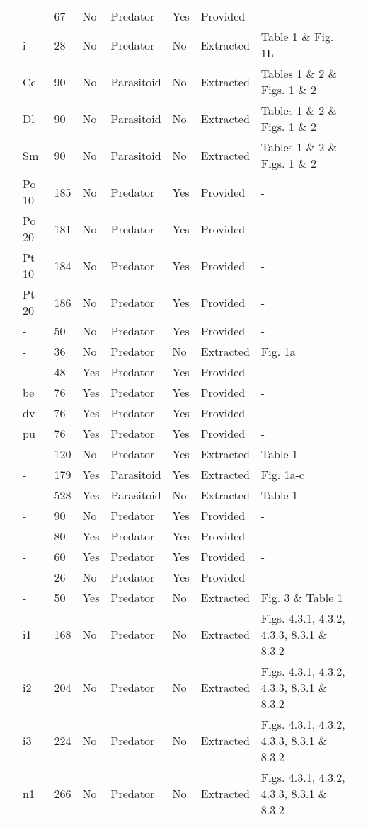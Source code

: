 \begin{longtable}{lllllllll}
\citet{Kratina:2009aa}&-&67&No&Predator&Yes&Provided&-&\citet{Kratina:2020aa}\tabularnewline
\citet{Krylov:1992aa}&i&28&No&Predator&No&Extracted&Table 1 \& Fig. 1L&\citet{Novak:2020aa}\tabularnewline
\citet{Kumar:1985aa}&Cc&90&No&Parasitoid&No&Extracted&Tables 1 \& 2 \& Figs. 1 \& 2&\citet{Novak:2020aa}\tabularnewline
\citet{Kumar:1985aa}&Dl&90&No&Parasitoid&No&Extracted&Tables 1 \& 2 \& Figs. 1 \& 2&\citet{Novak:2020aa}\tabularnewline
\citet{Kumar:1985aa}&Sm&90&No&Parasitoid&No&Extracted&Tables 1 \& 2 \& Figs. 1 \& 2&\citet{Novak:2020aa}\tabularnewline
\citet{Lang:2012aa}&Po 10&185&No&Predator&Yes&Provided&-&\citet{Lang:2020aa}\tabularnewline
\citet{Lang:2012aa}&Po 20&181&No&Predator&Yes&Provided&-&\citet{Lang:2020aa}\tabularnewline
\citet{Lang:2012aa}&Pt 10&184&No&Predator&Yes&Provided&-&\citet{Lang:2020aa}\tabularnewline
\citet{Lang:2012aa}&Pt 20&186&No&Predator&Yes&Provided&-&\citet{Lang:2020aa}\tabularnewline
\citet{Long:2012aa}&-&50&No&Predator&Yes&Provided&-&\citet{Long:2020aa}\tabularnewline
\citet{Mansour:1991aa}&-&36&No&Predator&No&Extracted&Fig. 1a&\citet{Novak:2020aa}\tabularnewline
\citet{Medoc:2013aa}&-&48&Yes&Predator&Yes&Provided&-&\tabularnewline
\citet{Medoc:2015aa}&be&76&Yes&Predator&Yes&Provided&-&\tabularnewline
\citet{Medoc:2015aa}&dv&76&Yes&Predator&Yes&Provided&-&\tabularnewline
\citet{Medoc:2015aa}&pu&76&Yes&Predator&Yes&Provided&-&\tabularnewline
\citet{Mertz:1968aa}&-&120&No&Predator&Yes&Extracted&Table 1&\citet{Novak:2020aa}\tabularnewline
\citet{Mills:2004aa}&-&179&Yes&Parasitoid&Yes&Extracted&Fig. 1a-c&\citet{Novak:2020aa}\tabularnewline
\citet{Montoya:2000aa}&-&528&Yes&Parasitoid&No&Extracted&Table 1&\citet{Novak:2020aa}\tabularnewline
\citet{Omkar:2004aa}&-&90&No&Predator&Yes&Provided&-&\tabularnewline
\citet{Prokopenko:2017aa}&-&80&Yes&Predator&Yes&Provided&-&\citet{Prokopenko:2020aa}\tabularnewline
\citet{Pusack:2018aa}&-&60&Yes&Predator&Yes&Provided&-&\citet{Pusack:2020aa}\tabularnewline
\citet{Reeve:1997aa}&-&26&No&Predator&Yes&Provided&-&\citet{Reeve:2020aa}\tabularnewline
\citet{Salt:1974aa}&-&50&Yes&Predator&No&Extracted&Fig. 3 \& Table 1&\citet{Novak:2020aa}\tabularnewline
\citet{Uttley:1980aa}&i1&168&No&Predator&No&Extracted&Figs. 4.3.1, 4.3.2, 4.3.3, 8.3.1 \& 8.3.2&\citet{Novak:2020aa}\tabularnewline
\citet{Uttley:1980aa}&i2&204&No&Predator&No&Extracted&Figs. 4.3.1, 4.3.2, 4.3.3, 8.3.1 \& 8.3.2&\citet{Novak:2020aa}\tabularnewline
\citet{Uttley:1980aa}&i3&224&No&Predator&No&Extracted&Figs. 4.3.1, 4.3.2, 4.3.3, 8.3.1 \& 8.3.2&\citet{Novak:2020aa}\tabularnewline
\citet{Uttley:1980aa}&n1&266&No&Predator&No&Extracted&Figs. 4.3.1, 4.3.2, 4.3.3, 8.3.1 \& 8.3.2&\citet{Novak:2020aa}\tabularnewline

\end{longtable}
